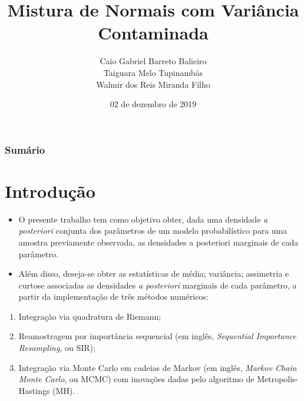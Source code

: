 \documentclass[9pt]{beamer}
\title[Mistura de Normais com Variância Contaminada]{Mistura de Normais com Variância Contaminada}
\author[Caio, Taiguara e Walmir]{\normalsize Caio Gabriel Barreto Balieiro\\ Taiguara Melo Tupinambás\\ Walmir dos Reis Miranda Filho}
\institute[]{\normalsize Programa de Pós-Graduação em Estatística\\ Departamento de Estatística - UFMG }
\date[06/12/2019]{02 de dezembro de 2019}
\begin{document}
	
	\begin{frame}[plain]
	\titlepage
\end{frame}

\begin{frame}[plain]
\frametitle{Sumário}
\tableofcontents
\end{frame}
\section{Introdução}
\begin{frame}
\begin{itemize}
\justifying
\item O presente trabalho tem como objetivo obter, dada uma densidade \textit{a posteriori} conjunta dos parâmetros de um modelo probabilístico para uma amostra previamente observada, as densidades a posteriori marginais de cada parâmetro.

\item Além disso, deseja-se obter as estatísticas de média; variância; assimetria e curtose associadas as densidades \textit{a posteriori} marginais de cada parâmetro, a partir da implementação de três métodos numéricos:
\end{itemize}
\begin{enumerate}
	\justifying
	\item Integração via quadratura de Riemann;
	\item Reamostragem por importância sequencial (em inglês, \textit{Sequential Importance Resampling}, ou SIR);
	\item Integração via Monte Carlo em cadeias de Markov (em inglês, \textit{Markov Chain Monte Carlo}, ou MCMC) com inovações dadas pelo algoritmo de Metropolis-Hastings (MH).
\end{enumerate}
\end{frame}
\end{document}
